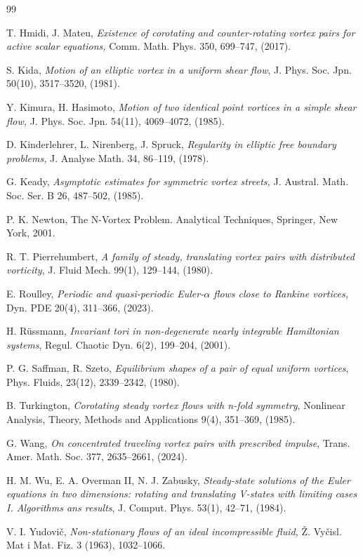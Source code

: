 \documentclass[a4paper,reqno,10pt]{article}
\begin{document}
\begin{thebibliography}{99}
    
T. Hmidi, J. Mateu, 
\textit{Existence of corotating and counter-rotating vortex pairs for active scalar equations,}
Comm. Math. Phys. 350, 699--747, (2017).

    S. Kida,
\textit{Motion of an elliptic vortex in a uniform shear flow}, 
J. Phys. Soc. Jpn. 50(10), 3517--3520, (1981).

	
    Y. Kimura, H. Hasimoto, 
    {\it Motion of two identical point vortices in a simple shear flow, }
J. Phys. Soc. Jpn. 54(11), 4069--4072, (1985).

D. Kinderlehrer, L. Nirenberg,  J. Spruck, 
{\it Regularity in elliptic free boundary problems,} 
J. Analyse Math. 34, 86--119, (1978).



  G. Keady, 
  {\it Asymptotic estimates for symmetric vortex streets,} 
  J. Austral. Math. Soc. Ser. B 26,  487--502, (1985).

P. K. Newton, 
{The N-Vortex Problem. Analytical Techniques,} 
Springer, New York, 2001.

 R. T. Pierrehumbert, 
 {\it A family of steady, translating vortex pairs with distributed vorticity}, 
 J. Fluid Mech. 99(1), 129--144, (1980).

E. Roulley,
\textit{Periodic and quasi-periodic Euler-$\alpha$ flows close to Rankine vortices,} 
Dyn. PDE 20(4), 311--366, (2023).

	H. R\"ussmann, 
    {\it Invariant tori in non-degenerate nearly integrable Hamiltonian systems}, 
    {Regul. Chaotic Dyn.} 6(2), 199--204, (2001).

    P. G. Saﬀman, R. Szeto, 
    {\it Equilibrium shapes of a pair of equal uniform vortices}, 
    Phys. Fluids, 23(12), 2339--2342, (1980).


     B. Turkington, 
     {\it Corotating steady vortex flows with n-fold symmetry}, 
     Nonlinear Analysis, Theory, Methods and  Applications 9(4), 351--369,  (1985).

     
G. Wang, 
{\it  On concentrated traveling vortex pairs with prescribed impulse}, Trans. Amer. Math. Soc. 377, 2635--2661, (2024).

H. M. Wu, E. A. Overman II, N. J. Zabusky, 
{\it Steady-state solutions of the Euler equations in two dimensions:
rotating and translating V-states with limiting cases I. Algorithms ans results}, 
J. Comput. Phys. 53(1), 42--71, (1984). 

	
	V. I. Yudovi\v{c},
    \textit{Non-stationary flows of an ideal incompressible fluid,}
    \v{Z}. Vy\v{c}isl. Mat i Mat. Fiz. 3 (1963), 1032--1066.
	
	
	
\end{thebibliography}




 
\end{document}

